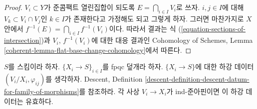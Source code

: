 \begin{proof}
$V_i \subset Y$가 준콤팩트 열린집합이 되도록
$E = \bigcap_{i \in I} V_i$로 쓰자. $i, j \in I$에 대해
$V_k \subset V_i \cap V_j$인 $k \in I$가 존재한다고 가정해도 되고 그렇게
하자. 그러면 마찬가지로 $X$ 안에서
$f^{-1}(E) = \bigcap_{i \in I} f^{-1}(V_i)$이다. 따라서 결과는 식
(\ref{equation-sections-of-intersection})과 $V_i$, $f^{-1}(V_i)$에 대한
대응 결과인 Cohomology of Schemes, Lemma
\ref{coherent-lemma-flat-base-change-cohomology}에서 따른다.
\end{proof}

\begin{lemma}[Gabber]
\label{lemma-ind-quasi-affine}
$S$를 스킴이라 하자. $\{X_i \to S\}_{i\in I}$를 fpqc 덮개라 하자.
$\{X_i \to S\}$에 대한 하강 데이터 $(V_i/X_i, \varphi_{ij})$를 생각하자.
Descent, Definition
\ref{descent-definition-descent-datum-for-family-of-morphisms}를 참조하라.
각 사상 $V_i \to X_i$가 ind-준아핀이면 이 하강 데이터는 유효하다.
\end{lemma}

